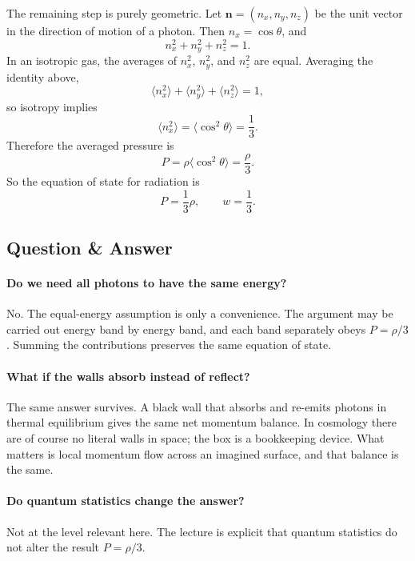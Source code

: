 The remaining step is purely geometric. Let \(\mathbf n=(n_x,n_y,n_z)\) be the unit vector in the direction of motion of a photon. Then \(n_x=\cos\theta\), and
\begin{equation}
n_x^2+n_y^2+n_z^2=1.
\end{equation}
In an isotropic gas, the averages of \(n_x^2\), \(n_y^2\), and \(n_z^2\) are equal. Averaging the identity above,
\begin{equation}
\langle n_x^2\rangle+\langle n_y^2\rangle+\langle n_z^2\rangle=1,
\end{equation}
so isotropy implies
\begin{equation}
\langle n_x^2\rangle=\langle \cos^2\theta\rangle=\frac13.
\end{equation}
Therefore the averaged pressure is
\begin{equation}
P=\rho\langle \cos^2\theta\rangle=\frac{\rho}{3}.
\end{equation}
So the equation of state for radiation is
\begin{equation}
P=\frac13\rho,
\qquad
w=\frac13.
\end{equation}

\subsection{Question \& Answer}

\paragraph{Do we need all photons to have the same energy?} No. The equal-energy assumption is only a convenience. The argument may be carried out energy band by energy band, and each band separately obeys \(P=\rho/3\). Summing the contributions preserves the same equation of state.

\paragraph{What if the walls absorb instead of reflect?} The same answer survives. A black wall that absorbs and re-emits photons in thermal equilibrium gives the same net momentum balance. In cosmology there are of course no literal walls in space; the box is a bookkeeping device. What matters is local momentum flow across an imagined surface, and that balance is the same.

\paragraph{Do quantum statistics change the answer?} Not at the level relevant here. The lecture is explicit that quantum statistics do not alter the result \(P=\rho/3\).


